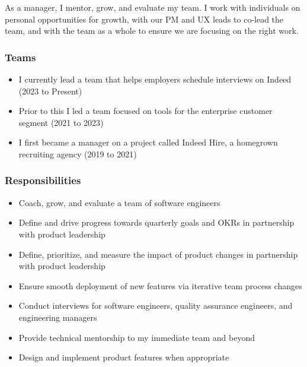 \documentclass[11pt]{amsart}
\begin{document}
% 
%
\begin{tcolorbox}[
	title=Software Engineering Manager \textcolor{DarkGray}{/} Indeed,
	after title={\hfill2019 \textcolor{DarkGray}{$\rightarrow$} Present \textcolor{DarkGray}{(5 years)}}
]

As a manager, I mentor, grow, and evaluate my team. I work with individuals on personal opportunities for growth, with our PM and UX leads to co-lead the team, and with the team as a whole to ensure we are focusing on the right work.

\subsubsection{Teams}

\begin{itemize}[noitemsep, leftmargin=2em, label=\raisebox{0.25ex}{\tiny$\bullet$}]
	\item I currently lead a team that helps employers schedule interviews on Indeed (2023 to Present)
	\item Prior to this I led a team focused on tools for the enterprise customer segment (2021 to 2023)
	\item I first became a manager on a project called Indeed Hire, a homegrown recruiting agency (2019 to 2021)
\end{itemize}

\subsubsection{Responsibilities}

\begin{itemize}[noitemsep, leftmargin=2em, label=\raisebox{0.25ex}{\tiny$\bullet$}]
	\item Coach, grow, and evaluate a team of software engineers
	\item Define and drive progress towards quarterly goals and \textsc{OKR}s in partnership with product leadership
	\item Define, prioritize, and measure the impact of product changes in partnership with product leadership
	\item Ensure smooth deployment of new features via iterative team process changes
	\item Conduct interviews for software engineers, quality assurance engineers, and engineering managers
	\item Provide technical mentorship to my immediate team and beyond
	\item Design and implement product features when appropriate
\end{itemize}


\end{tcolorbox}
\end{document}
